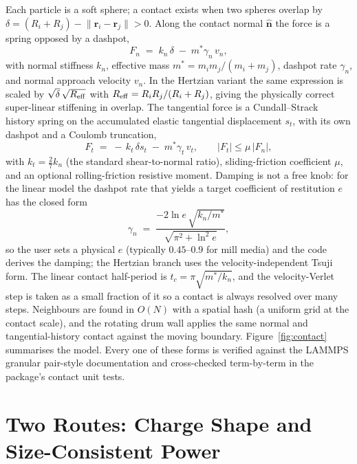 \documentclass[journal]{IEEEtran}
\begin{document}
Each particle is a soft sphere; a contact exists when two spheres overlap by $\delta = (R_i+R_j) - \lVert
\mathbf{r}_i-\mathbf{r}_j\rVert > 0$. Along the contact normal $\hat{\mathbf n}$ the force is a spring opposed by
a dashpot,
\begin{equation}
F_n \;=\; k_n\,\delta \;-\; m^{*}\gamma_n\,v_n ,
\end{equation}
with normal stiffness $k_n$, effective mass $m^{*}=m_i m_j/(m_i+m_j)$, dashpot rate $\gamma_n$, and normal
approach velocity $v_n$. In the Hertzian variant the same expression is scaled by $\sqrt{\delta}\,\sqrt{R_{\rm
eff}}$ with $R_{\rm eff}=R_iR_j/(R_i+R_j)$, giving the physically correct super-linear stiffening in overlap. The
tangential force is a Cundall--Strack~\cite{cundall} history spring on the accumulated elastic tangential
displacement $s_t$, with its own dashpot and a Coulomb truncation,
\begin{equation}
F_t \;=\; -\,k_t\,\delta s_t \;-\; m^{*}\gamma_t\,v_t, \qquad \lvert F_t\rvert \le \mu\,\lvert F_n\rvert ,
\end{equation}
with $k_t = \tfrac{2}{7}k_n$ (the standard shear-to-normal ratio), sliding-friction coefficient $\mu$, and an
optional rolling-friction resistive moment. Damping is not a free knob: for the linear model the dashpot rate
that yields a target coefficient of restitution $e$ has the closed form~\cite{tsuji,golpayegani}
\begin{equation}
\gamma_n \;=\; \frac{-2\ln e\,\sqrt{k_n/m^{*}}}{\sqrt{\pi^{2}+\ln^{2} e}} ,
\end{equation}
so the user sets a physical $e$ (typically $0.45$--$0.9$ for mill media) and the code derives the damping; the
Hertzian branch uses the velocity-independent Tsuji form. The linear contact half-period is $t_c =
\pi\sqrt{m^{*}/k_n}$, and the velocity-Verlet step is taken as a small fraction of it so a contact is always
resolved over many steps. Neighbours are found in $O(N)$ with a spatial hash (a uniform grid at the contact
scale), and the rotating drum wall applies the same normal and tangential-history contact against the moving
boundary. Figure~\ref{fig:contact} summarises the model. Every one of these forms is verified against the LAMMPS
granular pair-style documentation and cross-checked term-by-term in the package's contact unit tests.

\section{Two Routes: Charge Shape and Size-Consistent Power}\label{sec:routes}
\end{document}
